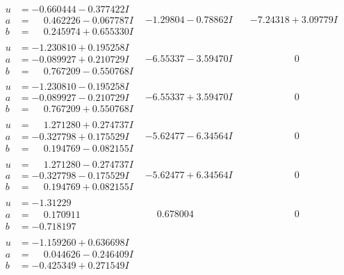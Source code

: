 \documentclass[1p]{elsarticle_modified}
\theoremstyle{definition}
\begin{document}
$$\begin{array}{c|c|c}
\begin{aligned}
u &= -0.660444 - 0.377422 I \\
a &= \phantom{-}0.462226 - 0.067787 I \\
b &= \phantom{-}0.245974 + 0.655330 I\end{aligned}
 & -1.29804 - 0.78862 I & -7.24318 + 3.09779 I \\ \hline\begin{aligned}
u &= -1.230810 + 0.195258 I \\
a &= -0.089927 + 0.210729 I \\
b &= \phantom{-}0.767209 - 0.550768 I\end{aligned}
 & -6.55337 - 3.59470 I & \phantom{-0.000000 } 0 \\ \hline\begin{aligned}
u &= -1.230810 - 0.195258 I \\
a &= -0.089927 - 0.210729 I \\
b &= \phantom{-}0.767209 + 0.550768 I\end{aligned}
 & -6.55337 + 3.59470 I & \phantom{-0.000000 } 0 \\ \hline\begin{aligned}
u &= \phantom{-}1.271280 + 0.274737 I \\
a &= -0.327798 + 0.175529 I \\
b &= \phantom{-}0.194769 - 0.082155 I\end{aligned}
 & -5.62477 - 6.34564 I & \phantom{-0.000000 } 0 \\ \hline\begin{aligned}
u &= \phantom{-}1.271280 - 0.274737 I \\
a &= -0.327798 - 0.175529 I \\
b &= \phantom{-}0.194769 + 0.082155 I\end{aligned}
 & -5.62477 + 6.34564 I & \phantom{-0.000000 } 0 \\ \hline\begin{aligned}
u &= -1.31229\phantom{ +0.000000I} \\
a &= \phantom{-}0.170911\phantom{ +0.000000I} \\
b &= -0.718197\phantom{ +0.000000I}\end{aligned}
 & \phantom{-}0.678004\phantom{ +0.000000I} & \phantom{-0.000000 } 0 \\ \hline\begin{aligned}
u &= -1.159260 + 0.636698 I \\
a &= \phantom{-}0.044626 - 0.246409 I \\
b &= -0.425349 + 0.271549 I\end{aligned}

\end{array}$$
\end{document}
